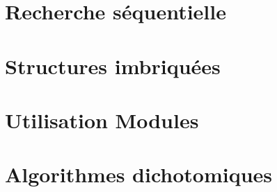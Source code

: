 \proffalse
\begin{multicols}{2}


\section*{Recherche séquentielle}
\renewcommand{\repExo}{../../Informatique/S1_Themes/01_RechercheSequentielle}

\renewcommand{\td}{01_AlgorithmesBasiques}
\graphicspath{{\repStyle/png/}{\repExo/\td/images/}}


\renewcommand{\td}{02_Dictionnaires}
\graphicspath{{\repStyle/png/}{\repExo/\td/images/}}



\section*{Structures imbriquées}
\renewcommand{\repExo}{../../Informatique/S1_Themes/02_StructuresImbriquees}

\renewcommand{\td}{01_RechercheDansTexte}
\graphicspath{{\repStyle/png/}{\repExo/\td/images/}}


\renewcommand{\td}{02_TriBulles}
\graphicspath{{\repStyle/png/}{\repExo/\td/images/}}



\section*{Utilisation Modules}
\renewcommand{\repExo}{../../Informatique/S1_Themes/03_UtilisationModules}

\renewcommand{\td}{01_SurfingPorquerolles}
\graphicspath{{\repStyle/png/}{\repExo/\td/images/}}


\section*{Algorithmes dichotomiques}
\renewcommand{\repExo}{../../Informatique/S1_Themes/04_AlgorithmesDichotomiques}

\renewcommand{\td}{01_RechercheDichotomique}
\graphicspath{{\repStyle/png/}{\repExo/\td/images/}}



\end{multicols}
